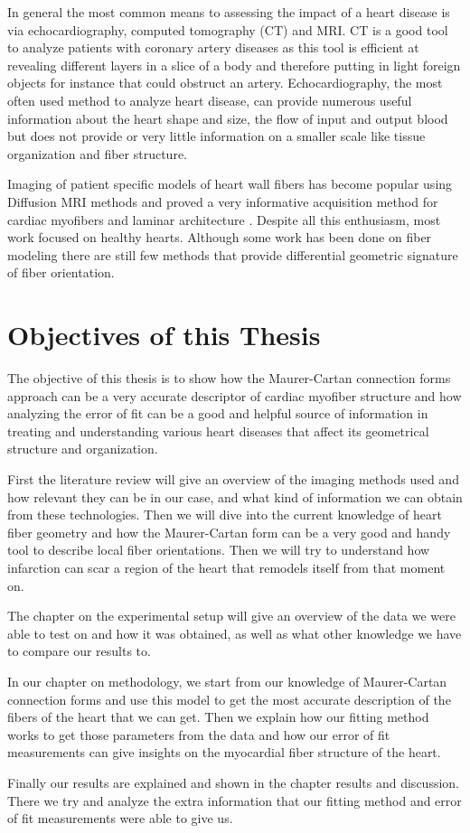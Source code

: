 In general the most common means to assessing the impact of a heart disease is via echocardiography, computed tomography (CT) and MRI. CT is a good tool to analyze patients with coronary artery diseases as this tool is efficient at revealing different layers in a slice of a body and therefore putting in light foreign objects for instance that could obstruct an artery. Echocardiography, the most often used method to analyze heart disease, can provide numerous useful information about the heart shape and size, the flow of input and output blood but does not provide or very little information on a smaller scale like tissue organization and fiber structure.

Imaging of patient specific models of heart wall fibers has become popular using Diffusion MRI methods and proved a very informative acquisition method for cardiac myofibers and laminar architecture \cite{rademakers1994relation, helm2005measuring, rohmer2007reconstruction}. Despite all this enthusiasm, most work focused on healthy hearts. Although some work has been done on fiber modeling \cite{pami2015, savadjiev2012heart} there are still few methods that provide differential geometric signature of fiber orientation.

\section{Objectives of this Thesis}

The objective of this thesis is to show how the Maurer-Cartan connection forms approach can be a very accurate descriptor of cardiac myofiber structure and how analyzing the error of fit can be a good and helpful source of information in treating and understanding various heart diseases that affect its geometrical structure and organization.

First the literature review will give an overview of the imaging methods used and how relevant they can be in our case, and what kind of information we can obtain from these technologies. Then we will dive into the current knowledge of heart fiber geometry and how the Maurer-Cartan form can be a very good and handy tool to describe local fiber orientations. Then we will try to understand how infarction can scar a region of the heart that remodels itself from that moment on.

The chapter on the experimental setup will give an overview of the data we were able to test on and how it was obtained, as well as what other knowledge we have to compare our results to.

In our chapter on methodology, we start from our knowledge of Maurer-Cartan connection forms and use this model to get the most accurate description of the fibers of the heart \cite{pami2015} that we can get. Then we explain how our fitting method works to get those parameters from the data and how our error of fit measurements can give insights on the myocardial fiber structure of the heart.

Finally our results are explained and shown in the chapter results and discussion. There we try and analyze the extra information that our fitting method and error of fit measurements were able to give us.